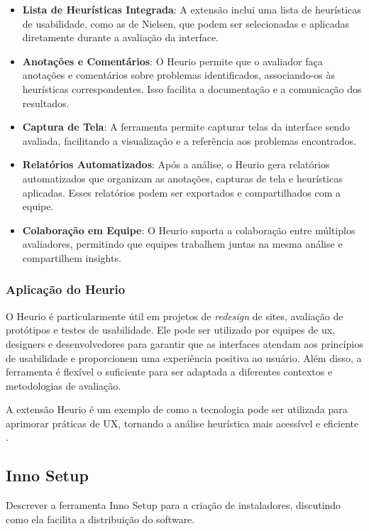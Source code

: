 \begin{itemize}
    \item \textbf{Lista de Heurísticas Integrada}: A extensão inclui uma lista de heurísticas de usabilidade, como as de Nielsen, que podem ser selecionadas e aplicadas diretamente durante a avaliação da interface.
    
    \item \textbf{Anotações e Comentários}: O Heurio permite que o avaliador faça anotações e comentários sobre problemas identificados, associando-os às heurísticas correspondentes. Isso facilita a documentação e a comunicação dos resultados.
    
    \item \textbf{Captura de Tela}: A ferramenta permite capturar telas da interface sendo avaliada, facilitando a visualização e a referência aos problemas encontrados.
    
    \item \textbf{Relatórios Automatizados}: Após a análise, o Heurio gera relatórios automatizados que organizam as anotações, capturas de tela e heurísticas aplicadas. Esses relatórios podem ser exportados e compartilhados com a equipe.
    
    \item \textbf{Colaboração em Equipe}: O Heurio suporta a colaboração entre múltiplos avaliadores, permitindo que equipes trabalhem juntas na mesma análise e compartilhem insights.
\end{itemize}

\subsubsection{Aplicação do Heurio}
O Heurio é particularmente útil em projetos de \textit{redesign} de sites, avaliação de protótipos e testes de usabilidade. Ele pode ser utilizado por equipes de \gls{ux}, designers e desenvolvedores para garantir que as interfaces atendam aos princípios de usabilidade e proporcionem uma experiência positiva ao usuário. Além disso, a ferramenta é flexível o suficiente para ser adaptada a diferentes contextos e metodologias de avaliação.

A extensão Heurio é um exemplo de como a tecnologia pode ser utilizada para aprimorar práticas de UX, tornando a análise heurística mais acessível e eficiente \citep{Heurio2023}.

\subsection{Inno Setup}
Descrever a ferramenta Inno Setup para a criação de instaladores, discutindo como ela facilita a distribuição do software.


